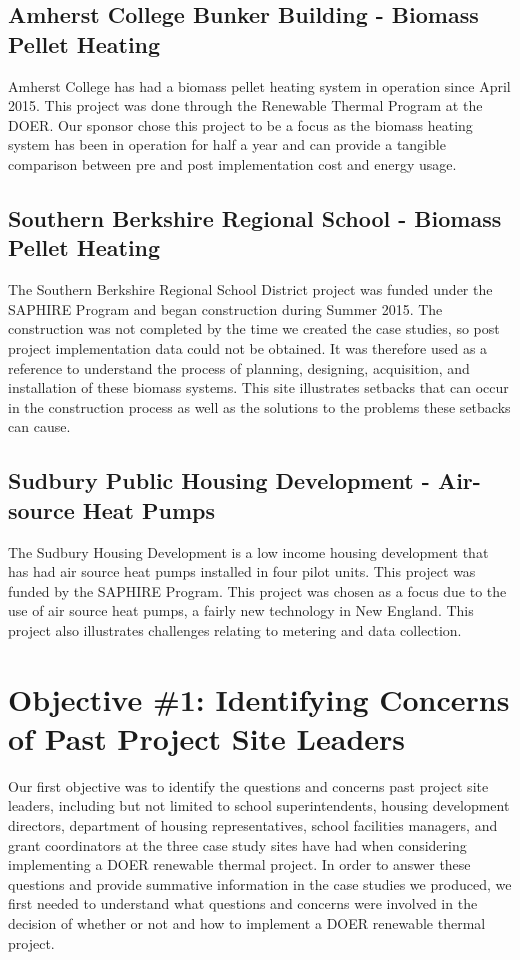     \subsection{Amherst College Bunker Building - Biomass Pellet Heating}
    \par Amherst College has had a biomass pellet heating system in operation since April 2015. This project was done through the Renewable Thermal Program at the DOER. Our sponsor chose this project to be a focus as the biomass heating system has been in operation for half a year and can provide a tangible comparison between pre and post implementation cost and energy usage.

    \subsection{Southern Berkshire Regional School - Biomass Pellet Heating}
    \par The Southern Berkshire Regional School District project was funded under the SAPHIRE Program and began construction during Summer 2015. The construction was not completed by the time we created the case studies, so post project implementation data could not be obtained. It was therefore used as a reference to understand the process of planning, designing, acquisition, and installation of these biomass systems. This site illustrates setbacks that can occur in the construction process as well as the solutions to the problems these setbacks can cause.

    \subsection{Sudbury Public Housing Development - Air-source Heat Pumps}
    \par The Sudbury Housing Development is a low income housing development that has had air source heat pumps installed in four pilot units. This project was funded by the SAPHIRE Program. This project was chosen as a focus due to the use of air source heat pumps, a fairly new technology in New England. This project also illustrates challenges relating to metering and data collection.

  \section{Objective \#1: Identifying Concerns of Past Project Site Leaders}
  \par Our first objective was to identify the questions and concerns past project site leaders, including but not limited to school superintendents, housing development directors, department of housing representatives, school facilities managers, and grant coordinators at the three case study sites have had when considering implementing a DOER renewable thermal project. In order to answer these questions and provide summative information in the case studies we produced, we first needed to understand what questions and concerns were involved in the decision of whether or not and how to implement a DOER renewable thermal project. 

